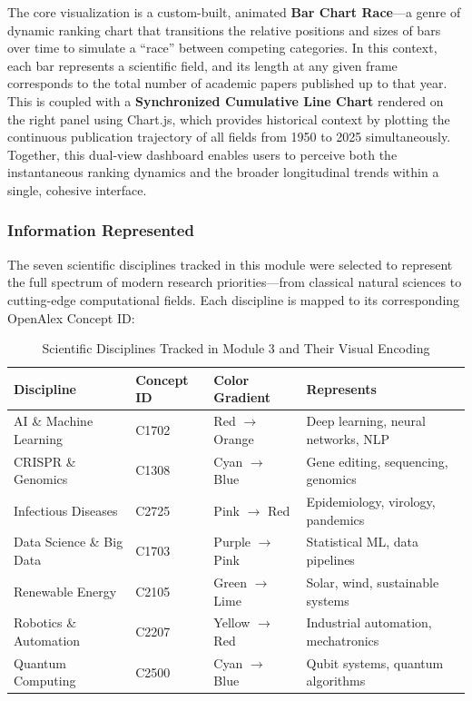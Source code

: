 \documentclass[12pt,a4paper]{article}
\begin{document}
The core visualization is a custom-built, animated \textbf{Bar Chart Race}---a genre of dynamic
ranking chart that transitions the relative positions and sizes of bars over time to simulate
a ``race'' between competing categories. In this context, each bar represents a scientific
field, and its length at any given frame corresponds to the total number of academic papers
published up to that year. This is coupled with a \textbf{Synchronized Cumulative Line
Chart} rendered on the right panel using Chart.js, which provides historical context by
plotting the continuous publication trajectory of all fields from 1950 to 2025 simultaneously.
Together, this dual-view dashboard enables users to perceive both the instantaneous ranking
dynamics and the broader longitudinal trends within a single, cohesive interface.

\subsubsection{Information Represented}
The seven scientific disciplines tracked in this module were selected to represent the full
spectrum of modern research priorities---from classical natural sciences to cutting-edge
computational fields. Each discipline is mapped to its corresponding OpenAlex Concept ID:

\begin{table}[H]
\centering
\caption{Scientific Disciplines Tracked in Module 3 and Their Visual Encoding}
\begin{tabular}{lllp{4.5cm}}
\toprule
\textbf{Discipline} & \textbf{Concept ID} & \textbf{Color Gradient} & \textbf{Represents} \\
\midrule
AI \& Machine Learning    & C1702 & Red $\rightarrow$ Orange   & Deep learning, neural networks, NLP \\
CRISPR \& Genomics        & C1308 & Cyan $\rightarrow$ Blue    & Gene editing, sequencing, genomics \\
Infectious Diseases       & C2725 & Pink $\rightarrow$ Red     & Epidemiology, virology, pandemics \\
Data Science \& Big Data  & C1703 & Purple $\rightarrow$ Pink  & Statistical ML, data pipelines \\
Renewable Energy          & C2105 & Green $\rightarrow$ Lime   & Solar, wind, sustainable systems \\
Robotics \& Automation    & C2207 & Yellow $\rightarrow$ Red   & Industrial automation, mechatronics \\
Quantum Computing         & C2500 & Cyan $\rightarrow$ Blue    & Qubit systems, quantum algorithms \\
\bottomrule
\end{tabular}
\label{tab:viz3_topics}
\end{table}
\end{document}
